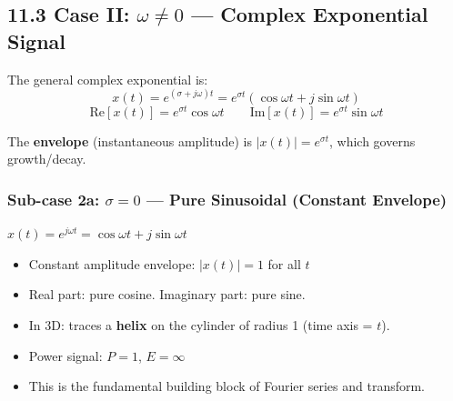 \documentclass[10pt,a4paper]{article}
\begin{document}
\subsection*{11.3 Case II: $\omega \neq 0$ --- Complex Exponential Signal}

The general complex exponential is:
\[
x(t) = e^{(\sigma+j\omega)t} = e^{\sigma t}(\cos\omega t + j\sin\omega t)
\]
\[
\text{Re}[x(t)] = e^{\sigma t}\cos\omega t \qquad \text{Im}[x(t)] = e^{\sigma t}\sin\omega t
\]

The \textbf{envelope} (instantaneous amplitude) is $|x(t)| = e^{\sigma t}$, which governs growth/decay.

\subsubsection*{Sub-case 2a: $\sigma = 0$ --- Pure Sinusoidal (Constant Envelope)}

\begin{propbox}
$x(t) = e^{j\omega t} = \cos\omega t + j\sin\omega t$

\begin{itemize}
  \item Constant amplitude envelope: $|x(t)| = 1$ for all $t$
  \item Real part: pure cosine. Imaginary part: pure sine.
  \item In 3D: traces a \textbf{helix} on the cylinder of radius 1 (time axis = $t$).
  \item Power signal: $P = 1$, $E = \infty$
  \item This is the fundamental building block of Fourier series and transform.
\end{itemize}
\end{propbox}

\begin{center}
\end{center}
\end{document}
